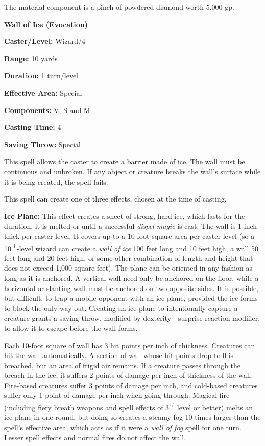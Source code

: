 \begin{multicols}{2}
The material component is a pinch of powdered diamond worth 5,000 gp.

\vspace{1em}

\noindent
\begin{minipage}{\columnwidth}

\noindent \textbf{Wall of Ice (Evocation)}

\noindent \textbf{Caster/Level:} Wizard/4

\noindent \textbf{Range:} 10 yards

\noindent \textbf{Duration:} 1 turn/level

\noindent \textbf{Effective Area:} Special

\noindent \textbf{Components:} V, S and M

\noindent \textbf{Casting Time:} 4

\noindent \textbf{Saving Throw:} Special

\end{minipage}

This spell allows the caster to create a barrier made of ice.  The wall must be continuous and unbroken.  If any object or creature breaks the wall's surface while it is being created, the spell fails. 

This spell can create one of three effects, chosen at the time of casting.

\textbf{Ice Plane:} This effect creates a sheet of strong, hard ice, which lasts for the duration, it is melted or until a successful \textit{dispel magic} is cast.  The wall is 1 inch thick per caster level.  It covers up to a 10-foot-square area per caster level (so a 10\textsuperscript{th}-level wizard can create a \textit{wall of ice} 100 feet long and 10 feet high, a wall 50 feet long and 20 feet high, or some other combination of length and height that does not exceed 1,000 square feet).  The plane can be oriented in any fashion as long as it is anchored.  A vertical wall need only be anchored on the floor, while a horizontal or slanting wall must be anchored on two opposite sides.   It is possible, but difficult, to trap a mobile opponent with an ice plane, provided the ice forms to block the only way out.  Creating an ice plane to intentionally capture a creature grants a saving throw, modified by dexterity---surprise reaction modifier, to allow it to escape before the wall forms.

Each 10-foot square of wall has 3 hit points per inch of thickness.  Creatures can hit the wall automatically.  A section of wall whose hit points drop to 0 is breached, but an area of frigid air remains.  If a creature passes through the breach in the ice, it suffers 2 points of damage per inch of thickness of the wall.  Fire-based creatures suffer 3 points of damage per inch, and cold-based creatures suffer only 1 point of damage per inch when going through.  Magical fire (including fiery breath weapons and spell effects of 3\textsuperscript{rd} level or better) melts an ice plane in one round, but doing so creates a steamy fog 10 times larger than the spell's effective area, which acts as if it were a \textit{wall of fog} spell for one turn.  Lesser spell effects and normal fires do not affect the wall.


\end{multicols}
